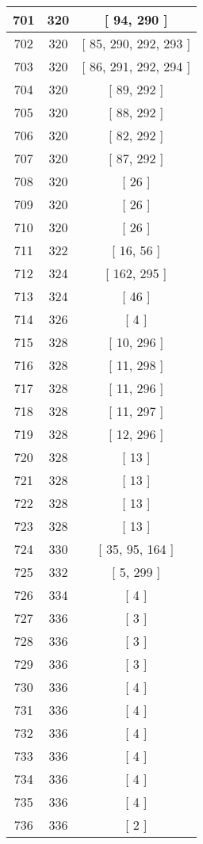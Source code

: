 \begin{center}
\begin{longtable}[H]{|| c c c ||}
\hline
701 & 320 & [ 94, 290 ] \\ 
\hline
702 & 320 & [ 85, 290, 292, 293 ] \\ 
\hline
703 & 320 & [ 86, 291, 292, 294 ] \\ 
\hline
704 & 320 & [ 89, 292 ] \\ 
\hline
705 & 320 & [ 88, 292 ] \\ 
\hline
706 & 320 & [ 82, 292 ] \\ 
\hline
707 & 320 & [ 87, 292 ] \\ 
\hline
708 & 320 & [ 26 ] \\ 
\hline
709 & 320 & [ 26 ] \\ 
\hline
710 & 320 & [ 26 ] \\ 
\hline
711 & 322 & [ 16, 56 ] \\ 
\hline
712 & 324 & [ 162, 295 ] \\ 
\hline
713 & 324 & [ 46 ] \\ 
\hline
714 & 326 & [ 4 ] \\ 
\hline
715 & 328 & [ 10, 296 ] \\ 
\hline
716 & 328 & [ 11, 298 ] \\ 
\hline
717 & 328 & [ 11, 296 ] \\ 
\hline
718 & 328 & [ 11, 297 ] \\ 
\hline
719 & 328 & [ 12, 296 ] \\ 
\hline
720 & 328 & [ 13 ] \\ 
\hline
721 & 328 & [ 13 ] \\ 
\hline
722 & 328 & [ 13 ] \\ 
\hline
723 & 328 & [ 13 ] \\ 
\hline
724 & 330 & [ 35, 95, 164 ] \\ 
\hline
725 & 332 & [ 5, 299 ] \\ 
\hline
726 & 334 & [ 4 ] \\ 
\hline
727 & 336 & [ 3 ] \\ 
\hline
728 & 336 & [ 3 ] \\ 
\hline
729 & 336 & [ 3 ] \\ 
\hline
730 & 336 & [ 4 ] \\ 
\hline
731 & 336 & [ 4 ] \\ 
\hline
732 & 336 & [ 4 ] \\ 
\hline
733 & 336 & [ 4 ] \\ 
\hline
734 & 336 & [ 4 ] \\ 
\hline
735 & 336 & [ 4 ] \\ 
\hline
736 & 336 & [ 2 ] \\ 

\end{longtable}
\end{center}
